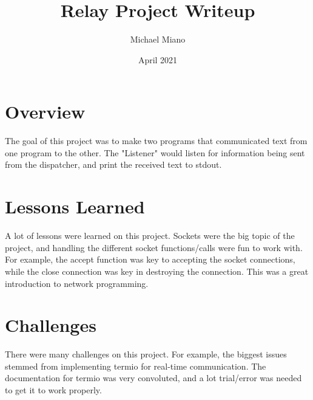 \documentclass{article}
\title{Relay Project Writeup}
\author{Michael Miano}
\date{April 2021}
\begin{document}
\maketitle

\section{Overview}
The goal of this project was to make two programs that communicated text from one program to the other. The "Listener" would listen for information being sent from the dispatcher, and print the received text to stdout.

\section{Lessons Learned}
A lot of lessons were learned on this project. Sockets were the big topic of the project, and handling the different socket functions/calls were fun to work with. For example, the accept function was key to accepting the socket connections, while the close connection was key in destroying the connection. This was a great introduction to network programming.

\section{Challenges}
There were many challenges on this project. For example, the biggest issues stemmed from implementing termio for real-time communication. The documentation for termio was very convoluted, and a lot trial/error was needed to get it to work properly.
\end{document}
